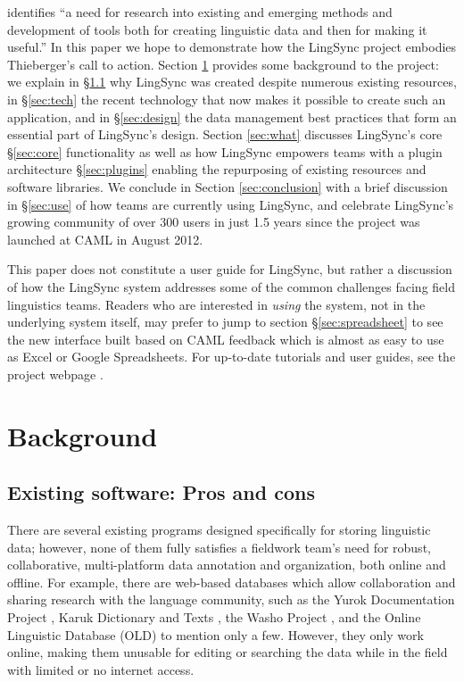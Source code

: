 \documentclass[letterpaper, 12pt, dvips]{mitwpl}
\begin{document}
\cite{Thieberger:2012} identifies ``a need for research into existing and emerging methods and development of tools both for creating linguistic data and then for making it useful.'' 
In this paper we hope to demonstrate how the LingSync project embodies Thieberger's call to action. Section \ref{sec:background} provides some background to the project: we explain in \S \ref{sec:why} why  LingSync was created despite numerous existing resources, in \S \ref{sec:tech} the recent technology that now makes it possible to create such an application,  and in  \S \ref{sec:design} the data management best practices that form an essential part of LingSync's design. 
Section \ref{sec:what} discusses LingSync's core \S \ref{sec:core} functionality as well as how LingSync empowers teams  with a plugin architecture \S  \ref{sec:plugins} enabling the  repurposing of existing resources and software libraries. We conclude in Section \ref{sec:conclusion} with a brief discussion in \S \ref{sec:use} of how teams are currently using LingSync, and celebrate LingSync's  growing community of over 300 users in just 1.5 years since the project was launched at CAML in August 2012.

This paper does not constitute a user guide for LingSync, 
but rather a discussion of how the LingSync system addresses some of the common challenges facing field linguistics teams.  Readers who are interested in \emph{using} the system, not in the underlying system itself, may prefer to jump to section \S \ref{sec:spreadsheet} to see the new interface built based on CAML feedback which is almost as easy to use as Excel or Google Spreadsheets. For up-to-date tutorials and user guides, see the project webpage \citep{LingSync:2013}.


\section{Background}
\label{sec:background}

\subsection{Existing software: Pros and cons}
\label{sec:why}


There are several existing programs designed specifically for storing linguistic data; however,
none of them fully satisfies a fieldwork team's need for robust,
collaborative,
multi-platform data annotation and organization,
both online and offline.
For example,
there are web-based databases which allow collaboration and sharing research with the language community,
such as 
the Yurok Documentation Project \citep{Yurok:2001:Online},
 Karuk Dictionary and Texts \citep{Karuk:2009:Online},
the Washo Project \citep{Washo:2005:Online, WashoMobile:2008:Online, Cihlar:2008}, 
and the Online Linguistic Database (OLD) \citep{OLD:2010:Online} to mention only a few. 
However, they only work online,
making them unusable for editing or searching the data while in the field with limited or no internet access.
\end{document}
